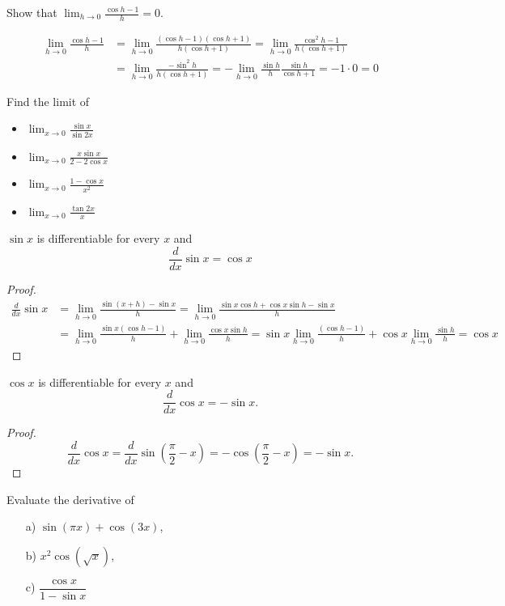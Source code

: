 \documentclass[calc1-main.tex]{subfiles}
\begin{document}
  \begin{example}
    Show that $\lim_{h \to 0} \frac{\cos h - 1}{h} = 0$.
  \end{example}
  \begin{solution}
    \[
      \begin{split}
      \lim_{h \to 0} \frac{\cos h - 1}{h} & =
      \lim_{h \to 0} \frac{(\cos h - 1)(\cos h + 1)}{h(\cos h + 1)} =
      \lim_{h \to 0} \frac{\cos^2 h - 1}{h(\cos h + 1)} \\
      &= \lim_{h \to 0} \frac{-\sin^2 h}{h(\cos h + 1)}
      = -\lim_{h \to 0} \frac{\sin h}{h} \frac{\sin h}{\cos h + 1} = -1 \cdot 0 = 0
      \end{split}
    \]
  \end{solution}

  \begin{example}
    Find the limit of
    \begin{itemize}
      \item $\lim_{x \to 0} \frac{\sin x}{\sin 2x}$
      \item $\lim_{x \to 0} \frac{x \sin x}{2-2\cos x}$
      \item $\lim_{x \to 0} \frac{1-\cos x}{x^2}$
      \item $\lim_{x \to 0} \frac{\tan 2x}{x}$
    \end{itemize}
  \end{example}
  \begin{theorem}
    $\sin x$ is differentiable for every $x$ and
    \[
      \frac{d}{dx} \sin x = \cos x
    \]
  \end{theorem}
  \begin{proof}
    \[
      \begin{split}
        \frac{d}{dx} \sin x & =
        \lim_{h \to 0} \frac{\sin(x+h) - \sin x}{h} =
        \lim_{h \to 0} \frac{\sin x \cos h + \cos x \sin h - \sin x}{h}\\ &=
        \lim_{h \to 0} \frac{\sin x (\cos h-1)}{h} + \lim_{h \to 0} \frac{\cos x \sin h}{h} =
        \sin x \lim_{h \to 0} \frac{(\cos h-1)}{h} + \cos x \lim_{h \to 0} \frac{\sin h}{h} = \cos x
      \end{split}
    \]
  \end{proof}

  \begin{theorem}
    $\cos x$ is differentiable for every $x$ and
    \[
      \frac{d}{dx} \cos x = -\sin x.
    \]
  \end{theorem}
  \begin{proof}
    \[
      \frac{d}{dx} \cos x =
      \frac{d}{dx} \sin\left(\frac{\pi}{2} -x\right) =
      - \cos\left(\frac{\pi}{2} -x\right) = - \sin x.
    \]
  \end{proof}
  \begin{example}
    Evaluate the derivative of
    \begin{itemize}
      \item[a)] $\sin(\pi x) + \cos(3x)$,
      \item[b)] $x^2 \cos(\sqrt{x})$,
      \item[c)] $\dfrac{\cos x}{1- \sin x}$
    \end{itemize}
  \end{example}
\end{document}
